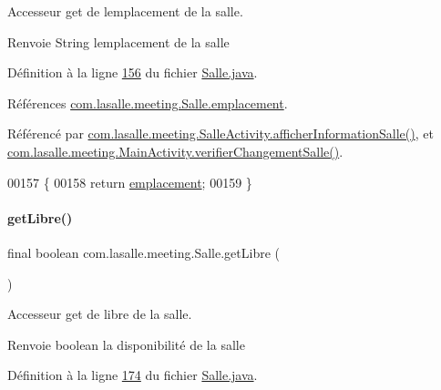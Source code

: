 Accesseur get de l\textquotesingle{}emplacement de la salle. 

\begin{DoxyReturn}{Renvoie}
String l\textquotesingle{}emplacement de la salle 
\end{DoxyReturn}


Définition à la ligne \hyperlink{_salle_8java_source_l00156}{156} du fichier \hyperlink{_salle_8java_source}{Salle.\+java}.



Références \hyperlink{_salle_8java_source_l00036}{com.\+lasalle.\+meeting.\+Salle.\+emplacement}.



Référencé par \hyperlink{_salle_activity_8java_source_l00103}{com.\+lasalle.\+meeting.\+Salle\+Activity.\+afficher\+Information\+Salle()}, et \hyperlink{_main_activity_8java_source_l00291}{com.\+lasalle.\+meeting.\+Main\+Activity.\+verifier\+Changement\+Salle()}.


\begin{DoxyCode}
00157     \{
00158         \textcolor{keywordflow}{return} \hyperlink{classcom_1_1lasalle_1_1meeting_1_1_salle_a9e31fc4d4c9125e511db52da3254bcba}{emplacement};
00159     \}
\end{DoxyCode}
\mbox{\label{classcom_1_1lasalle_1_1meeting_1_1_salle_adc0c4936355bc0ae22991f69c12a5e42}} 
\paragraph{\texorpdfstring{get\+Libre()}{getLibre()}}
{\footnotesize\ttfamily final boolean com.\+lasalle.\+meeting.\+Salle.\+get\+Libre (\begin{DoxyParamCaption}{ }\end{DoxyParamCaption})}



Accesseur get de libre de la salle. 

\begin{DoxyReturn}{Renvoie}
boolean la disponibilité de la salle 
\end{DoxyReturn}


Définition à la ligne \hyperlink{_salle_8java_source_l00174}{174} du fichier \hyperlink{_salle_8java_source}{Salle.\+java}.



